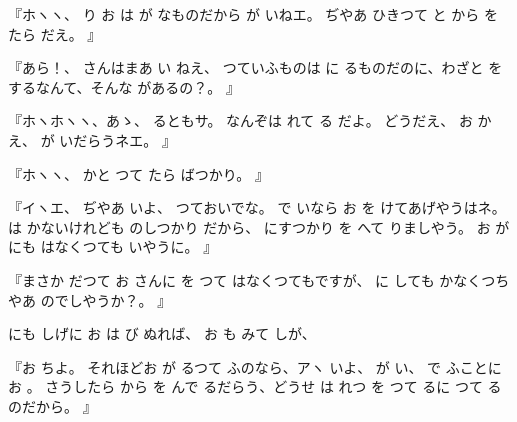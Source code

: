 『ホヽヽ、
り
お
は
が
なものだから
が
いねエ。
ぢやあ
ひきつて
と
から
を
たら
だえ。
』

『あら！、
さんはまあ
い
ねえ、
つていふものは
に
るものだのに、わざと
をするなんて、そんな
があるの？。
』

『ホヽホヽヽ、あゝ、
るともサ。
なんぞは
れて
る
だよ。
どうだえ、
お
かえ、
が
いだらうネエ。
』

『ホヽヽ、
かと
つて
たら
ばつかり。
』

『イヽエ、
ぢやあ
いよ、
つておいでな。
で
いなら
お
を
けてあげやうはネ。
は
かないけれども
のしつかり
だから、
にすつかり
を
へて
りましやう。
お
が
にも
はなくつても
いやうに。
』

『まさか
だつて
お
さんに
を
つて
はなくつてもですが、
に
しても
かなくつちやあ
のでしやうか？。
』

にも
しげに
お
は
び
ぬれば、
お
も
みて
しが、

『お
ちよ。
それほどお
が
るつて
ふのなら、アヽ
いよ、
が
い、
で
ふことに
お
。
さうしたら
から
を
んで
るだらう、どうせ
は
れつ
を
つて
るに
つて
るのだから。
』

